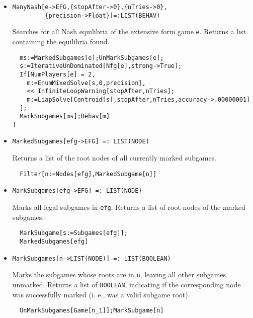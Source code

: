 \begin{itemize}
\item{}
\protect \large \begin{verbatim}
ManyNash[e->EFG,{stopAfter->0},{nTries->0},
         {precision->Float}]=:LIST(BEHAV)
\end{verbatim}\normalsize

\bd 
Searches for all Nash equilibria of the extensive form game
\verb+e+.  Returns a list containing the equilibria found.

\begin{verbatim}
  ms:=MarkedSubgames[e];UnMarkSubgames[e];
  s:=IterativeUnDominated[Nfg[e],strong->True];
  If[NumPlayers[e] = 2, 
    m:=EnumMixedSolve[s,0,precision],
    << InfiniteLoopWarning[stopAfter,nTries];
    m:=LiapSolve[Centroid[s],stopAfter,nTries,accuracy->.00000001]
  ];
  MarkSubgames[ms];Behav[m]
]  
\end{verbatim} 
\ed

\item{}
\protect \large \begin{verbatim}
MarkedSubgames[efg->EFG] =: LIST(NODE) 
\end{verbatim}\normalsize

\bd 
Returns a list of the root nodes of all currently marked subgames.  
\begin{verbatim}
  Filter[n:=Nodes[efg],MarkedSubgame[n]]
\end{verbatim} 
\ed

\item{}
\protect \large \begin{verbatim}
MarkSubgames[efg->EFG] =: LIST(NODE) 
\end{verbatim}\normalsize

\bd 
Marks all legal subgames in \verb+efg+.  Returns a list of root nodes
of the marked subgames.  
\begin{verbatim}
  MarkSubgame[s:=Subgames[efg]];
  MarkedSubgames[efg]
\end{verbatim} 
\ed


\item{}
\protect \large \begin{verbatim}
MarkSubgames[n->LIST(NODE)] =: LIST(BOOLEAN) 
\end{verbatim}\normalsize

\bd 
Marks the subgames whose roots are in \verb+n+, leaving all other
subgames unmarked.  Returns a list of \verb+BOOLEAN+, indicating if
the corresponding node was successfully marked (i. e., was a valid
subgame root).
\begin{verbatim}
  UnMarkSubgames[Game[n_1]];MarkSubgame[n]
\end{verbatim} 
\ed


\end{itemize}
